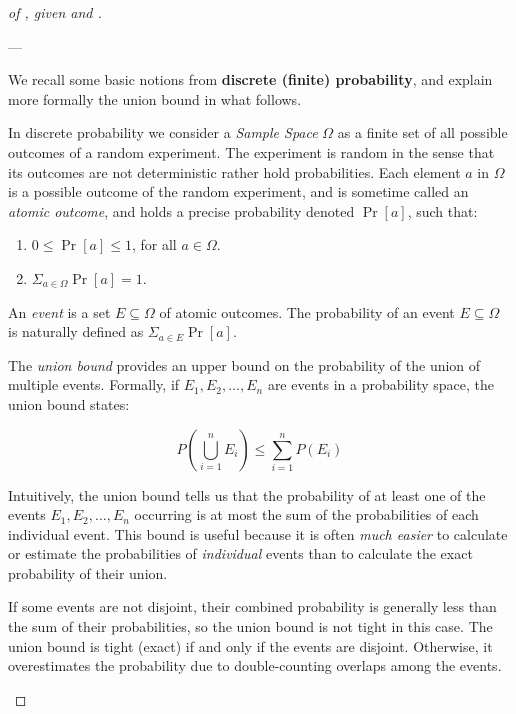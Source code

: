 \begin{proof}[of , given   and ]
\begin{tcolorbox}[colframe=white, colback=green!4, boxrule=0mm, sharp corners]
\small
\medskip 
---

We recall some  basic notions from  \textbf{discrete (finite) probability}, and explain more formally the union bound in what follows.

In discrete probability we consider a \emph{ Sample Space}
$\Omega$ as a finite set of  all possible outcomes of a random experiment. The experiment is random in the sense that its outcomes are not deterministic rather hold  probabilities. 
Each element $a$ in $\Omega$ is a possible outcome of the  random experiment, and is sometime called an \emph{atomic outcome}, and  holds a precise probability denoted $\Pr\left[a \right]$, such that:
\begin{enumerate}
\item $0\le \Pr\left[a\right]\le 1$, for all $a\in\Omega$.

\item $\Sigma_{a\in\Omega}\Pr[a]=1$.
\end{enumerate} 

An \emph{event} is a set $E\subseteq\Omega$ of atomic outcomes. The probability of an event $E\subseteq\Omega$ is naturally defined as $\Sigma_{a\in E}\Pr[a]$. 


\bigskip 
The \emph{union bound} provides an upper bound on the probability of the union of multiple events. Formally, if \( E_1, E_2, \dots, E_n \) are events in a probability space, the union bound states:

\[
P\left(\bigcup_{i=1}^n E_i\right) \leq \sum_{i=1}^n P(E_i)
\]

Intuitively, the union bound tells us that the probability of at least one of the events \( E_1, E_2, \dots, E_n \) occurring is at most the sum of the probabilities of each individual event. This bound is useful because it is often \emph{much easier} to calculate or estimate the probabilities of \emph{individual} events than to calculate the exact probability of their union.

 If some events are not disjoint, their combined probability is generally less than the sum of their probabilities, so the union bound is not tight in this case. The union bound is tight (exact) if and only if the events are disjoint. Otherwise, it overestimates the probability due to double-counting overlaps among the events.




\end{tcolorbox}


\end{proof}
